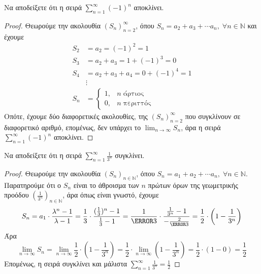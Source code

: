 \documentclass[a4paper,table]{report}
\begin{document}
\begin{example}
  Να αποδείξετε ότι η σειρά $ \sum_{n=1}^{\infty} (-1)^{n} $ αποκλίνει.
\end{example}
  \begin{proof}
    Θεωρούμε την ακολουθία $ {(S_{n})}_{n=2}^{\infty} $, όπου $ S_{n}= a_{2}+ a_{3} +
    \cdots a_{n}, \; \forall n \in \mathbb{N} $ και έχουμε
  \begin{align*}
    S_{2} &= a_{2} = (-1)^{2}=1 \\
    S_{3} &= a_{2}+ a_{3} = 1 + (-1)^{3} = 0 \\
    S_{4} &= a_{2}+ a_{3} + a_{4} = 0 + (-1)^{4} = 1 \\
    &\vdots \\
    S_{n} &= 
    \begin{cases}
      1,  &n \; \text{άρτιος} \\
      0,  &n \; \text{περιττός} 
    \end{cases}
   \end{align*} 
 Οπότε, έχουμε δύο διαφορετικές ακολουθίες, της $ {(S_{n})}_{n=2}^{\infty} $ 
 που συγκλίνουν σε διαφορετικό αριθμό, επομένως, δεν υπάρχει το 
 $ \lim_{n \to \infty} S_{n} $, άρα η σειρά $ \sum_{n=1}^{\infty} (-1)^{n} $ αποκλίνει.
  \end{proof}

\begin{example}
  Να αποδείξετε ότι η σειρά $ \sum_{n=1}^{\infty} \frac{1}{3^{n}} $ συγκλίνει.
\end{example}
\begin{proof}
  Θεωρούμε την ακολουθία $ {(S_{n})}_{n \in \mathbb{N}} $, όπου $ S_{n}= a_{1}+ a_{2} +
  \cdots a_{n}, \; \forall n \in \mathbb{N} $. 
  Παρατηρούμε ότι ο $ S_{n} $ είναι το άθροισμα των $n$ πρώτων όρων της γεωμετρικής 
  προόδου
  $ (\frac{1}{3^{n}})_{n \in \mathbb{N}} $, άρα όπως είναι γνωστό, έχουμε
  \[
    S_{n} = a_{1} \cdot \frac{\lambda ^{n}-1}{\lambda -1} = 
    \frac{1}{3} \cdot \frac{(\frac{1}{3} )^{n}-1}{\frac{1}{3} - 1} 
    = \frac{1}{\cancel{3}} \cdot \frac{\frac{1}{3^{n}} - 1}{- \frac{2}{\cancel{3}}} 
    = \frac{1}{2} \cdot \left(1 - \frac{1}{3^{n}}\right)
  \] 
  Άρα
  \[ 
    \lim_{n \to \infty} S_{n} = \lim_{n \to \infty} \frac{1}{2} \cdot 
    \left(1 - \frac{1}{3^{n}}\right) = \frac{1}{2} \cdot \lim_{n \to \infty} 
    \left(1 - \frac{1}{3^{n}}\right) = \frac{1}{2} \cdot (1-0) = \frac{1}{2}
  \]
  Επομένως, η σειρά συγκλίνει και μάλιστα 
  $ \sum_{n=1}^{\infty} \frac{1}{3^{n}} = \frac{1}{2} $
\end{proof}
\end{document}
